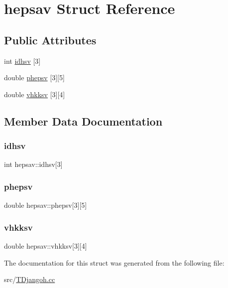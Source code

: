 \hypertarget{structhepsav}{}\section{hepsav Struct Reference}
\label{structhepsav}
\subsection*{Public Attributes}
\begin{DoxyCompactItemize}
\item 
int \hyperlink{structhepsav_a0074dd3f2c1d1e89728ba682286f781a}{idhsv} \mbox{[}3\mbox{]}
\item 
double \hyperlink{structhepsav_af234f77530e13fa12e0fec1b02429a1e}{phepsv} \mbox{[}3\mbox{]}\mbox{[}5\mbox{]}
\item 
double \hyperlink{structhepsav_aa2acf26100c07f4b31719e601e1152c9}{vhkksv} \mbox{[}3\mbox{]}\mbox{[}4\mbox{]}
\end{DoxyCompactItemize}


\subsection{Member Data Documentation}
\mbox{\label{structhepsav_a0074dd3f2c1d1e89728ba682286f781a}} 
\subsubsection{\texorpdfstring{idhsv}{idhsv}}
{\footnotesize\ttfamily int hepsav\+::idhsv\mbox{[}3\mbox{]}}

\mbox{\label{structhepsav_af234f77530e13fa12e0fec1b02429a1e}} 
\subsubsection{\texorpdfstring{phepsv}{phepsv}}
{\footnotesize\ttfamily double hepsav\+::phepsv\mbox{[}3\mbox{]}\mbox{[}5\mbox{]}}

\mbox{\label{structhepsav_aa2acf26100c07f4b31719e601e1152c9}} 
\subsubsection{\texorpdfstring{vhkksv}{vhkksv}}
{\footnotesize\ttfamily double hepsav\+::vhkksv\mbox{[}3\mbox{]}\mbox{[}4\mbox{]}}



The documentation for this struct was generated from the following file\+:\begin{DoxyCompactItemize}
\item 
src/\hyperlink{_t_djangoh_8cc}{T\+Djangoh.\+cc}\end{DoxyCompactItemize}
